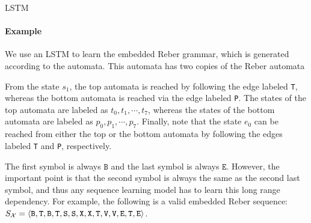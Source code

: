 %
\begin{frame}{LSTM}
\framesubtitle{Example}
    We use an LSTM to learn the embedded Reber grammar, which is generated
    according to the automata.%
    This automata has two copies of the Reber automata%

\medskip

From the state $s_1$, the top automata
    is reached by following the edge labeled \texttt{T}, whereas the
    bottom automata is reached via the edge labeled \texttt{P}. 
    The states of the top automata are labeled as $t_0, t_1,\cdots,t_7$,
    whereas the states of the bottom automata are labeled as $p_0, p_1,
    \cdots, p_7$. Finally, note that the state $e_0$ can be reached
    from either the top or the bottom automata by following the edges
    labeled \texttt{T} and \texttt{P}, respectively. 

\medskip

    The first symbol is always $\texttt{B}$ and the last symbol is
    always $\texttt{E}$. However, the important point is
    that the second symbol is always the same as the second last symbol,
    and thus any sequence learning model has to learn this long range
    dependency. For example, the following is a valid embedded Reber
    sequence:
    $S_{\mathcal X} = \langle \texttt{B}, \texttt{T}, \texttt{B}, \texttt{T}, 
        \texttt{S},
        \texttt{S}, \texttt{X}, \texttt{X}, \texttt{T}, \texttt{V},
    \texttt{V}, \texttt{E}, \texttt{T}, \texttt{E} \rangle$.
\end{frame}

